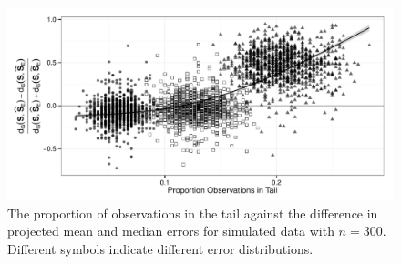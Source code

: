 \begin{figure}[h!]
\centering
\vspace{-0.5cm}
\includegraphics[width=.8\textwidth]{Nu75N300TailBehaviorStandard}
\caption{The proportion of observations in the tail against the difference in projected mean and median errors for simulated data with $n=300$.  Different symbols indicate different error distributions.}
\label{fig:SimTail}
\end{figure}

